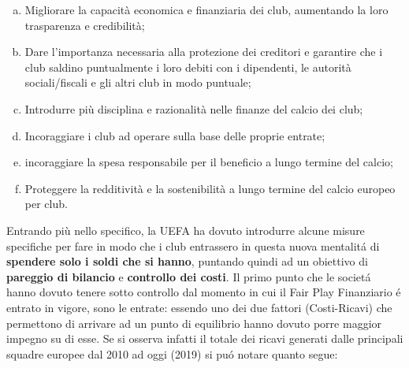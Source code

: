 \documentclass[
    corpo=12pt,
    oneside,
    evenboxes,
    tipotesi=triennale,
    stile=classica,
    oldstyle,
    autoretitolo,
    greek,
]{toptesi}
\begin{document}
\begin{interlinea}{1.5}
\begin{enumerate}[(a)]
    legali, personali, amministrativi e infrastrutturali in tutta Europa.
    \item Migliorare la capacità economica e finanziaria dei club, aumentando la loro
    trasparenza e credibilità;
    \item Dare l'importanza necessaria alla protezione dei creditori e garantire
    che i club saldino puntualmente i loro debiti con i dipendenti, le autorità sociali/fiscali e gli altri
    club in modo puntuale;
    \item Introdurre più disciplina e razionalità nelle finanze del calcio dei club;
    \item Incoraggiare i club ad operare sulla base delle proprie entrate;
    \item incoraggiare la spesa responsabile per il beneficio a lungo termine del calcio;
    \item Proteggere la redditività e la sostenibilità a lungo termine del calcio europeo per club.
\end{enumerate}
Entrando più nello specifico, la UEFA ha dovuto introdurre alcune misure specifiche per fare in modo che i club entrassero in questa nuova 
mentalit\'a di \textbf{spendere solo i soldi che si hanno}, puntando quindi ad un obiettivo di \textbf{pareggio di bilancio} e \textbf{
controllo dei costi}. Il primo punto che le societ\'a hanno dovuto tenere sotto controllo dal momento in cui il Fair Play Finanziario \'e entrato in vigore, 
sono le entrate: essendo uno dei due fattori (Costi-Ricavi) che permettono di arrivare ad un punto di equilibrio hanno dovuto porre maggior impegno su di esse. 
Se si osserva infatti il totale dei ricavi generati dalle principali squadre europee dal 2010 ad oggi (2019) si pu\'o notare quanto segue:
\begin{figure}
    \centering
     \quad

\end{figure}
\end{interlinea}
\end{document}
